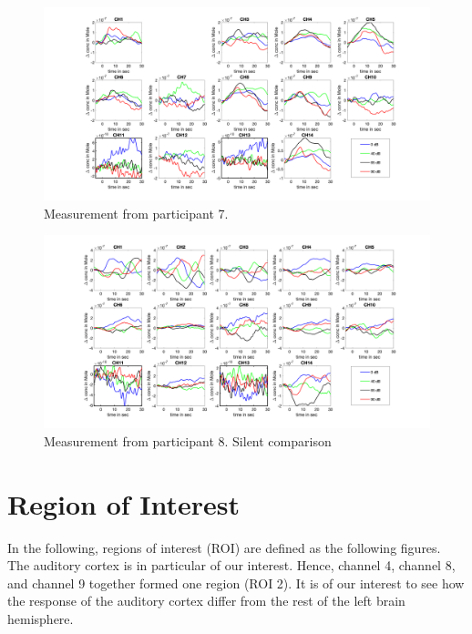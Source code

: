 \begin{figure}[H]
  \centering
    \includegraphics[scale=.4]{bilder/HbR_Mole/sub_liao_s_HbR.png}
  \caption{Measurement from participant 7.}
  \label{fig:somesignal}
\end{figure}


\begin{figure}[H]
  \centering
    \includegraphics[scale=.4]{bilder/HbR_Mole/sub_luca2_s_HbR.png}
  \caption{Measurement from participant 8. Silent comparison}
  \label{fig:somesignal}
\end{figure}





\section {Region of Interest}
In the following, regions of interest (ROI) are defined as the following figures. The auditory cortex is in particular of our interest. Hence, channel 4, channel 8, and channel 9 together formed one region (ROI 2). It is of our interest to see how the response of the auditory cortex differ from the rest of the left brain hemisphere.

